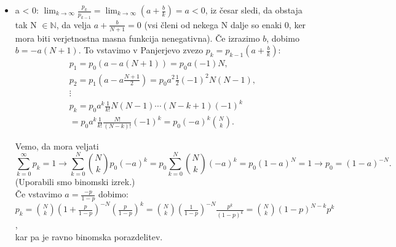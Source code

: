 \documentclass[a4paper]{article}
\begin{document}
\begin{enumerate}
\begin{itemize}
		\item  a < 0:
			\begin{math}
			\lim_{k \to \infty}
			\frac{p_k}{p_{k-1}} = 
			\lim_{k \to \infty} (a + \frac{b}{k}) = a < 0
			\end{math}, iz česar sledi, da obstaja tak N $\in \mathbb{N}$, da velja $a + \frac{b}{N + 1} = 0$ (vsi členi od nekega N dalje so enaki 0, ker mora biti verjetnostna masna funkcija nenegativna). Če izrazimo $b$, dobimo $b = -a(N+1)$. To vstavimo v Panjerjevo zvezo $p_k = p_{k-1} (a + \frac{b}{k})$:
			$$ \begin{array}{c}
			p_1 = p_0 (a - a(N+1)) = p_0 a (-1) N, \\[1.5mm]
			p_2 = p_1 (a - a \frac{N+1}{2}) = p_0 a^2 \frac{1}{2} (-1)^2 N (N-1), \\[1.5mm]
			\vdots \\[1.5mm]
			p_k = p_0 a^k \frac{1}{k!} N (N-1) \cdots (N - k + 1) (-1)^k\\[1.5mm] = p_0 a^k \frac{1}{k!} \frac{N!}{(N-k)!} (-1)^k = p_0 (-a)^k \binom{N}{k}.
			\end{array} $$
			
Vemo, da mora veljati 
$$
\sum_{k=0}^{\infty} p_k = 1 \rightarrow \sum_{k=0}^{N} \binom{N}{k} p_0 (-a)^k = p_0 \sum_{k=0}^{N} \binom{N}{k} (-a)^k = p_0 (1-a)^N = 1 \rightarrow p_0 = (1-a)^{-N} .$$ (Uporabili smo binomski izrek.) \\[1.5mm]
Če vstavimo $a = \frac{-p}{1-p}$ dobimo: \\[1.5mm]
$p_k = \binom{N}{k} (1+ \frac{p}{1-p})^{-N} (\frac{p}{1-p})^k = \binom{N}{k} (\frac{1}{1-p})^{-N} \frac{p^k}{(1-p)^k} = \binom{N}{k}(1-p)^{N-k} p^k$, \\[1.5mm]
kar pa je ravno binomska porazdelitev.
	 \end{itemize}
\end{enumerate}
\end{document}
